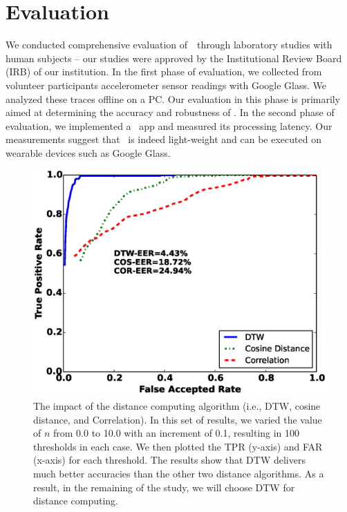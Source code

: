 \section{Evaluation}\label{sec:results}

We conducted comprehensive evaluation of~\systemname~through laboratory studies with
human subjects -- our studies were approved by the Institutional Review Board (IRB) of our
institution. In the first phase of evaluation, we collected from volunteer participants accelerometer sensor
readings with Google Glass. We analyzed these traces offline on a PC.
Our evaluation in this phase is primarily aimed at determining the accuracy and robustness of \systemname.
In the second phase of evaluation, we implemented a \systemname~app and measured its processing latency. Our measurements suggest that \systemname~is indeed light-weight and can be executed on wearable devices such as Google Glass.


\begin{figure}\centering
\includegraphics[width=.85\columnwidth]{figure/roc_dtw_cos_cor.eps}
\caption{\label{fig:roc_dtw_cos_cor} The impact of the distance computing algorithm (i.e., DTW, cosine distance, and Correlation). In this set of results, we varied the value of $n$ from 0.0 to 10.0 with an increment of 0.1, resulting in 100 thresholds in each case. We then plotted the TPR (y-axis) and FAR (x-axis) for each threshold. The results show that DTW delivers much better accuracies than the other two distance algorithms. As a result, in the remaining of the study, we will choose DTW for distance computing.}
\end{figure}

